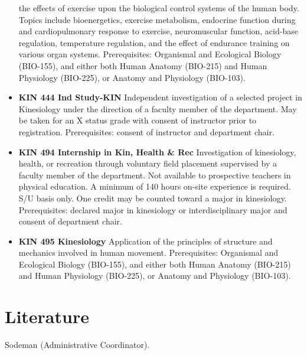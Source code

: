 \documentclass[
  letterpaper,
]{scrbook}
\begin{document}
\begin{itemize}
  the effects of exercise upon the biological control systems of the
  human body. Topics include bioenergetics, exercise metabolism,
  endocrine function during and cardiopulmonary response to exercise,
  neuromuscular function, acid-base regulation, temperature regulation,
  and the effect of endurance training on various organ systems.
  Prerequisites: Organismal and Ecological Biology (BIO-155), and either
  both Human Anatomy (BIO-215) and Human Physiology (BIO-225), or
  Anatomy and Physiology (BIO-103).
\item
  \textbf{KIN 444 Ind Study-KIN} Independent investigation of a selected
  project in Kinesiology under the direction of a faculty member of the
  department. May be taken for an X status grade with consent of
  instructor prior to registration. Prerequisites: consent of instructor
  and department chair.
\item
  \textbf{KIN 494 Internship in Kin, Health \& Rec} Investigation of
  kinesiology, health, or recreation through voluntary field placement
  supervised by a faculty member of the department. Not available to
  prospective teachers in physical education. A minimum of 140 hours
  on-site experience is required. S/U basis only. One credit may be
  counted toward a major in kinesiology. Prerequisites: declared major
  in kinesiology or interdisciplinary major and consent of department
  chair.
\item
  \textbf{KIN 495 Kinesiology} Application of the principles of
  structure and mechanics involved in human movement. Prerequisites:
  Organismal and Ecological Biology (BIO-155), and either both Human
  Anatomy (BIO-215) and Human Physiology (BIO-225), or Anatomy and
  Physiology (BIO-103).
\end{itemize}

\section{Literature}\label{sec-literature}

Sodeman (Administrative Coordinator).
\end{document}
